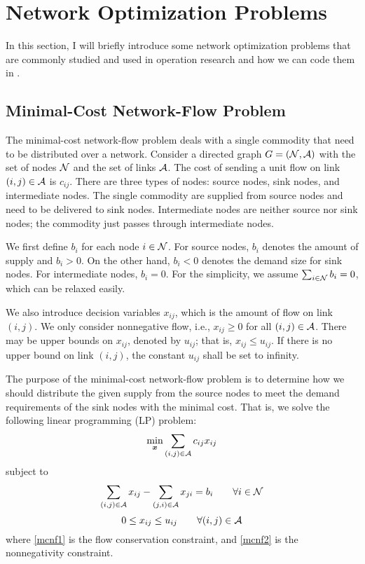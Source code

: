 
\chapter{Network Optimization Problems}


In this section, I will briefly introduce some network optimization problems that are commonly studied and used in operation research and how we can code them in \julia{}.


\section{Minimal-Cost Network-Flow Problem} \label{sec:mcnf}

The minimal-cost network-flow problem deals with a single commodity that need to be distributed over a network. Consider a directed graph $G=(\mathcal{N},\mathcal{A})$ with the set of nodes $\mathcal{N}$ and the set of links $\mathcal{A}$. The cost of sending a unit flow on link $(i,j)\in\mathcal{A}$ is $c_{ij}$. There are three types of nodes: source nodes, sink nodes, and intermediate nodes. The single commodity are supplied from source nodes and need to be delivered to sink nodes. Intermediate nodes are neither source nor sink nodes; the commodity just passes through intermediate nodes.

We first define $b_i$ for each node $i\in\mathcal{N}$. For source nodes, $b_i$ denotes the amount of supply and $b_i>0$. On the other hand, $b_i<0$ denotes the demand size for sink nodes. For intermediate nodes, $b_i=0$. For the simplicity, we assume $\sum_{i\in\mathcal{N}} b_i = 0$, which can be relaxed easily.

We also introduce decision variables $x_{ij}$, which is the amount of flow on link $(i,j)$. We only consider nonnegative flow, i.e., $x_{ij} \geq 0$ for all $(i,j)\in\mathcal{A}$. There may be upper bounds on $x_{ij}$, denoted by $u_{ij}$; that is, $x_{ij} \leq u_{ij}$. If there is no upper bound on link $(i,j)$, the constant $u_{ij}$ shall be set to infinity.

The purpose of the minimal-cost network-flow problem is to determine how we should distribute the given supply from the source nodes to meet the demand requirements of the sink nodes with the minimal cost. That is, we solve the following linear programming (LP) problem:
\begin{equation}
    \label{mcnf0}
	\min_{\boldsymbol{x}} \sum_{(i,j)\in\mathcal{A}} c_{ij} x_{ij}
\end{equation}
subject to
\begin{equation}
    \label{mcnf1}
    \sum_{(i,j)\in\mathcal{A}} x_{ij} - \sum_{(j,i)\in\mathcal{A}} x_{ji} = b_i \qquad \forall i\in\mathcal{N}
\end{equation}
\begin{equation}
    \label{mcnf2}
    0 \leq x_{ij} \leq u_{ij}  \qquad \forall (i,j)\in\mathcal{A}
\end{equation}
where \eqref{mcnf1} is the flow conservation constraint, and \eqref{mcnf2} is the nonnegativity constraint.

